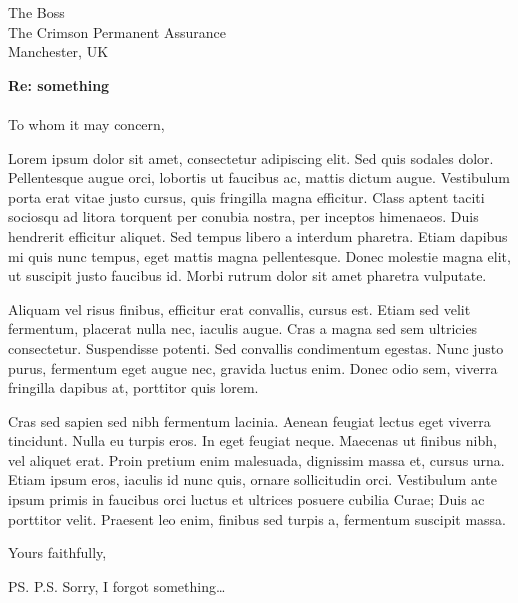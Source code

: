 \documentclass[nologo]{UoM_letter}
\begin{document}
\begin{letter}{The Boss \\ The Crimson Permanent Assurance \\ Manchester, UK}

\opening{\textbf{Re: something}\\\\To whom it may concern,}

Lorem ipsum dolor sit amet, consectetur adipiscing elit. Sed quis sodales dolor. Pellentesque augue orci, lobortis ut faucibus ac, mattis dictum augue. Vestibulum porta erat vitae justo cursus, quis fringilla magna efficitur. Class aptent taciti sociosqu ad litora torquent per conubia nostra, per inceptos himenaeos. Duis hendrerit efficitur aliquet. Sed tempus libero a interdum pharetra. Etiam dapibus mi quis nunc tempus, eget mattis magna pellentesque. Donec molestie magna elit, ut suscipit justo faucibus id. Morbi rutrum dolor sit amet pharetra vulputate.


Aliquam vel risus finibus, efficitur erat convallis, cursus est. Etiam sed velit fermentum, placerat nulla nec, iaculis augue. Cras a magna sed sem ultricies consectetur. Suspendisse potenti. Sed convallis condimentum egestas. Nunc justo purus, fermentum eget augue nec, gravida luctus enim. Donec odio sem, viverra fringilla dapibus at, porttitor quis lorem.


Cras sed sapien sed nibh fermentum lacinia. Aenean feugiat lectus eget viverra tincidunt. Nulla eu turpis eros. In eget feugiat neque. Maecenas ut finibus nibh, vel aliquet erat. Proin pretium enim malesuada, dignissim massa et, cursus urna. Etiam ipsum eros, iaculis id nunc quis, ornare sollicitudin orci. Vestibulum ante ipsum primis in faucibus orci luctus et ultrices posuere cubilia Curae; Duis ac porttitor velit. Praesent leo enim, finibus sed turpis a, fermentum suscipit massa.

\closing{Yours faithfully,}

\ps{P.S. Sorry, I forgot something\ldots}

\end{letter}
\end{document}

